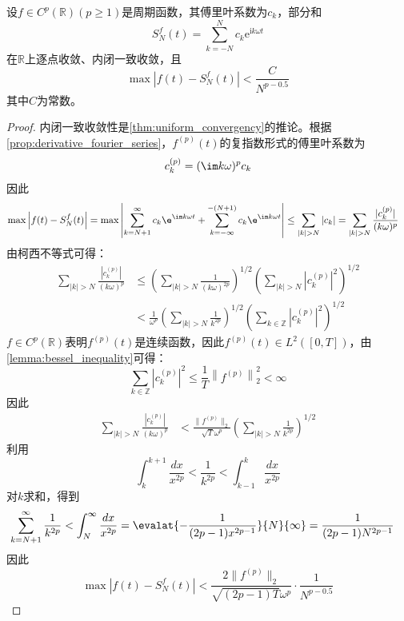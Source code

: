 \begin{theorem}\label{thm:converge_speed}
    设$f\in C^p(\mathbb{R} )(p\geq1)$是周期函数，其傅里叶系数为$c_k$，部分和
    \[S_N^f(t)=\sum_{k=-N}^{N}c_k \mathrm{e}^{\mathrm{i}k\omega t}\]
    在$\mathbb{R} $上逐点收敛、内闭一致收敛，且
    \[\max\left|f(t)-S_N^f(t)\right|<\frac{C}{N^{p-0.5}}\]
    其中$C$为常数。
\end{theorem}
\begin{proof}
    内闭一致收敛性是\cref{thm:uniform_convergency}的推论。根据\cref{prop:derivative_fourier_series}，$f^{(p)}(t)$的复指数形式的傅里叶系数为
    $$c^{(p)}_k=(\im k\omega)^p c_k$$
    因此
    \begin{align*}
        \max\left|f(t)-S_N^f(t)\right|&= \max\left|\sum_{k=N+1}^\infty c_k\e^{\im k\omega t}+\sum_{k=-\infty}^{-(N+1)}c_k\e^{\im k\omega t}\right|\le\sum_{|k|>N}|c_k|=\sum_{|k|>N}\frac{|c_k^{(p)}|}{(k\omega)^p}
    \end{align*}
    由柯西不等式可得：
    \begin{align*}
        \sum_{|k|>N}\frac{|c_k^{(p)}|}{(k\omega)^p}&\le\left(\sum_{|k|>N}\frac{1}{(k\omega)^{2p}}\right)^{1/2}\left(\sum_{|k|>N}|c^{(p)}_k|^2\right)^{1/2}\\
        &<\frac{1}{\omega^{p}}\left(\sum_{|k|>N}\frac{1}{k^{2p}}\right)^{1/2}\left(\sum_{k\in\mathbb{Z}}|c^{(p)}_k|^2\right)^{1/2}
    \end{align*}
    $f\in C^p(\mathbb{R} )$表明$f^{(p)}(t)$是连续函数，因此$f^{(p)}(t)\in L^2([0,T])$，由\cref{lemma:bessel_inequality}可得：
    $$\sum_{k\in\mathbb{Z}}\left|c^{(p)}_k\right|^2\le\frac{1}{T}\left\|f^{(p)}\right\|_2^2<\infty$$
    因此
    \begin{align*}
        \sum_{|k|>N}\frac{|c_k^{(p)}|}{(k\omega)^p}&<\frac{\|f^{(p)}\|_2}{\sqrt{T}\omega^{p}}\left(\sum_{|k|>N}\frac{1}{k^{2p}}\right)^{1/2}
    \end{align*}
    利用
    $$\int_{k}^{k+1}\frac{dx}{x^{2p}}<\frac{1}{k^{2p}}<\int_{k-1}^k\frac{dx}{x^{2p}}$$
    对$k$求和，得到
    \begin{align*}
        \sum_{k=N+1}^\infty\frac{1}{k^{2p}}&<\int_{N}^\infty\frac{dx}{x^{2p}}=\evalat{-\frac{1}{(2p-1)x^{2p-1}}}{N}{\infty}=\frac{1}{(2p-1)N^{2p-1}}
    \end{align*}
    因此
    $$\max\left|f(t)-S_N^f(t)\right|<\frac{2\|f^{(p)}\|_2}{\sqrt{(2p-1)T}\omega^{p}}\cdot\frac{1}{N^{p-0.5}}$$
\end{proof}
